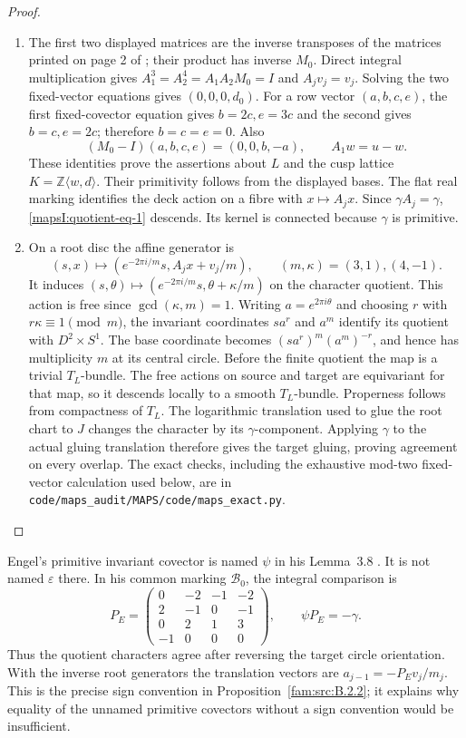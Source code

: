 \begin{proof}
\begin{enumerate}[label=\arabic*.,leftmargin=*]
\item The first two displayed matrices are the inverse transposes of
the matrices printed on page 2 of \cite{AC2026}; their product
has inverse $M_0$.  Direct integral multiplication gives
$A_1^3=A_2^4=A_1A_2M_0=I$ and $A_jv_j=v_j$.
Solving the two fixed-vector equations gives $(0,0,0,d_0)$.
For a row vector $(a,b,c,e)$, the first fixed-covector equation
gives $b=2c,e=3c$ and the second gives $b=c,e=2c$;
therefore $b=c=e=0$.  Also
\[
 (M_0-I)(a,b,c,e)=(0,0,b,-a),\qquad
 A_1w=u-w.
\]
These identities prove the assertions about $L$ and the cusp
lattice $K=\mathbb Z\langle w,d\rangle$.  Their primitivity follows
from the displayed bases.  The flat real marking identifies the
deck action on a fibre with $x\mapsto A_jx$.  Since
$\gamma A_j=\gamma$, \eqref{mapsI:quotient-eq-1} descends.  Its kernel is connected
because $\gamma$ is primitive.

\item On a root disc the affine generator is
\[
 (s,x)\longmapsto
 (e^{-2\pi i/m}s,A_jx+v_j/m),\qquad (m,\kappa)=(3,1),(4,-1).
\]
It induces $(s,\theta)\mapsto
(e^{-2\pi i/m}s,\theta+\kappa/m)$ on the character quotient.
This action is free since $\gcd(\kappa,m)=1$.  Writing
$a=e^{2\pi i\theta}$ and choosing $r$ with $r\kappa\equiv1\pmod m$,
the invariant coordinates $s a^r$ and $a^m$ identify its quotient
with $D^2\times S^1$.  The base coordinate becomes
$(s a^r)^m(a^m)^{-r}$, and hence has multiplicity $m$ at its
central circle.  Before the finite quotient the map is a trivial
$T_L$-bundle.  The free actions on source and target are
equivariant for that map, so it descends locally to a smooth
$T_L$-bundle.  Properness follows from compactness of $T_L$.
The logarithmic translation used to glue the root chart to $J$
changes the character by its $\gamma$-component.  Applying
$\gamma$ to the actual gluing translation therefore gives the
target gluing, proving agreement on every overlap.
The exact checks, including the exhaustive mod-two fixed-vector
calculation used below, are in \texttt{code/maps\_audit/MAPS/code/maps\_exact.py}.
\end{enumerate}
\end{proof}


Engel's primitive invariant covector is named $\psi$ in his
Lemma~3.8 \cite[Lemma~3.8]{Engel2026}.  It is not named $\varepsilon$ there.  In his
common marking $\mathcal B_0$, the integral comparison is
\[
 P_E=\begin{pmatrix}0&-2&-1&-2\\2&-1&0&-1\\0&2&1&3\\-1&0&0&0\end{pmatrix},
 \qquad \psi P_E=-\gamma.
 \label{mapsI:quotient-eq-2}
\]
Thus the quotient characters agree after reversing the target
circle orientation.  With the inverse root generators the
translation vectors are $a_{j-1}=-P_Ev_j/m_j$.
This is the precise sign convention in Proposition~\ref{fam:src:B.2.2}; it explains why equality of the unnamed primitive
covectors without a sign convention would be insufficient.

